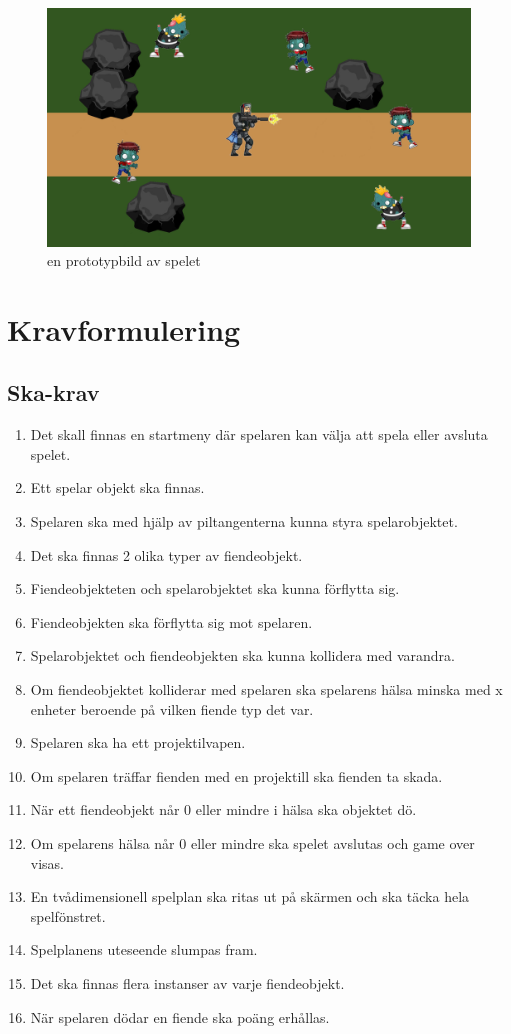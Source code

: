 \documentclass{TDP005mall}
\begin{document}
\begin{figure}[H]
  \includegraphics[width=\linewidth]{test.png}
  \caption {en prototypbild av spelet}
  \label {fig:picture}
\end {figure}


\section{Kravformulering}
\subsection{Ska-krav}
\begin{enumerate}[label=S\arabic*]
\item Det skall finnas en startmeny där spelaren kan välja att spela eller avsluta spelet.
\item Ett spelar objekt ska finnas.
\item Spelaren ska med hjälp av piltangenterna kunna styra spelarobjektet.
\item Det ska finnas 2 olika typer av fiendeobjekt.
\item Fiendeobjekteten och spelarobjektet ska kunna förflytta sig.
\item Fiendeobjekten ska förflytta sig mot spelaren.
\item Spelarobjektet och fiendeobjekten ska kunna kollidera med varandra.
\item Om fiendeobjektet kolliderar med spelaren ska spelarens hälsa minska med x enheter beroende på vilken fiende typ det var.
\item Spelaren ska ha ett projektilvapen.
\item Om spelaren träffar fienden med en projektill ska fienden ta skada.
\item När ett fiendeobjekt når 0 eller mindre i hälsa ska objektet dö.
\item Om spelarens hälsa når 0 eller mindre ska spelet avslutas och game over visas.
\item En tvådimensionell spelplan ska ritas ut på skärmen och ska täcka hela spelfönstret.
\item Spelplanens uteseende slumpas fram.
\item Det ska finnas flera instanser av varje fiendeobjekt.
\item När spelaren dödar en fiende ska poäng erhållas.
\end{enumerate}
\end{document}
